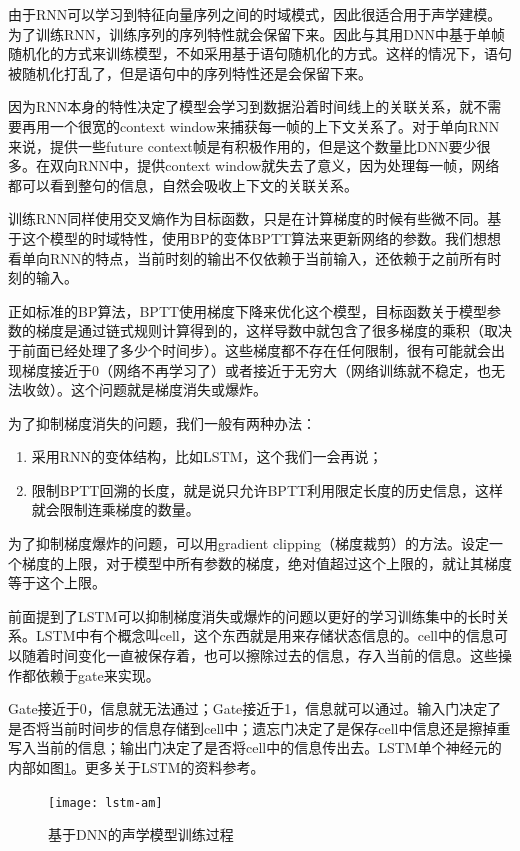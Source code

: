 由于RNN可以学习到特征向量序列之间的时域模式，因此很适合用于声学建模。为了训练RNN，训练序列的序列特性就会保留下来。因此与其用DNN中基于单帧随机化的方式来训练模型，不如采用基于语句随机化的方式。这样的情况下，语句被随机化打乱了，但是语句中的序列特性还是会保留下来。

因为RNN本身的特性决定了模型会学习到数据沿着时间线上的关联关系，就不需要再用一个很宽的context window来捕获每一帧的上下文关系了。对于单向RNN来说，提供一些future context帧是有积极作用的，但是这个数量比DNN要少很多。在双向RNN中，提供context window就失去了意义，因为处理每一帧，网络都可以看到整句的信息，自然会吸收上下文的关联关系。

训练RNN同样使用交叉熵作为目标函数，只是在计算梯度的时候有些微不同。基于这个模型的时域特性，使用BP的变体BPTT算法来更新网络的参数。我们想想看单向RNN的特点，当前时刻的输出不仅依赖于当前输入，还依赖于之前所有时刻的输入。

正如标准的BP算法，BPTT使用梯度下降来优化这个模型，目标函数关于模型参数的梯度是通过链式规则计算得到的，这样导数中就包含了很多梯度的乘积（取决于前面已经处理了多少个时间步）。这些梯度都不存在任何限制，很有可能就会出现梯度接近于0（网络不再学习了）或者接近于无穷大（网络训练就不稳定，也无法收敛）。这个问题就是梯度消失或爆炸。

为了抑制梯度消失的问题，我们一般有两种办法：
\begin{enumerate}
  \item 采用RNN的变体结构，比如LSTM，这个我们一会再说；
  \item 限制BPTT回溯的长度，就是说只允许BPTT利用限定长度的历史信息，这样就会限制连乘梯度的数量。
\end{enumerate}

为了抑制梯度爆炸的问题，可以用gradient clipping（梯度裁剪）的方法。设定一个梯度的上限，对于模型中所有参数的梯度，绝对值超过这个上限的，就让其梯度等于这个上限。

前面提到了LSTM可以抑制梯度消失或爆炸的问题以更好的学习训练集中的长时关系。LSTM中有个概念叫cell，这个东西就是用来存储状态信息的。cell中的信息可以随着时间变化一直被保存着，也可以擦除过去的信息，存入当前的信息。这些操作都依赖于gate来实现。

Gate接近于0，信息就无法通过；Gate接近于1，信息就可以通过。输入门决定了是否将当前时间步的信息存储到cell中；遗忘门决定了是保存cell中信息还是擦掉重写入当前的信息；输出门决定了是否将cell中的信息传出去。LSTM单个神经元的内部如图\ref{fig:lstm-am}。更多关于LSTM的资料参考。
\begin{figure}[htbp]
  \centering
  \texttt{[image: lstm-am]}
  \caption{基于DNN的声学模型训练过程\label{fig:lstm-am}}
\end{figure}

